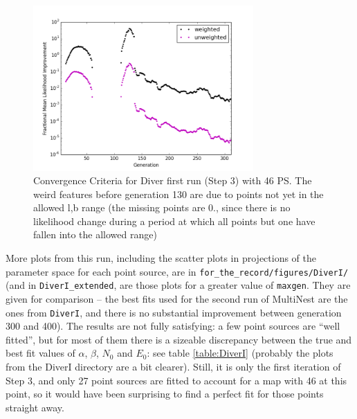 \documentclass{article}
\begin{document}
\begin{figure}[h]
\centering
\includegraphics[clip = true,width=0.75\textwidth]{figs/DiverIcgce.png}
\caption{Convergence Criteria for Diver first run (Step 3) with 46 PS. The weird features before generation 130 are due to points not yet in the allowed l,b range (the missing points are 0., since there is no likelihood change during a period at which all points but one have fallen into the allowed range)\label{fig:DiverIcgce}}
\end{figure}
More plots from this run, including the scatter plots in projections of the parameter space for each point source, are in \verb=for_the_record/figures/DiverI/= (and in \verb=DiverI_extended=, are those plots for a greater value of \verb=maxgen=. They are given for comparison -- the best fits used for the second run of MultiNest are the ones from \verb=DiverI=, and there is no substantial improvement between generation 300 and 400). The results are not fully satisfying: a few point sources are ``well fitted'', but for most of them there is a sizeable discrepancy between the true and best fit values of $\alpha$, $\beta$, $N_0$ and $E_0$: see table \ref{table:DiverI} (probably the plots from the DiverI directory are a bit clearer).  Still, it is only the first iteration of Step 3, and only 27 point sources are fitted to account for a map with 46 at this point, so it would have been surprising to find a perfect fit for those points straight away.
\end{document}
